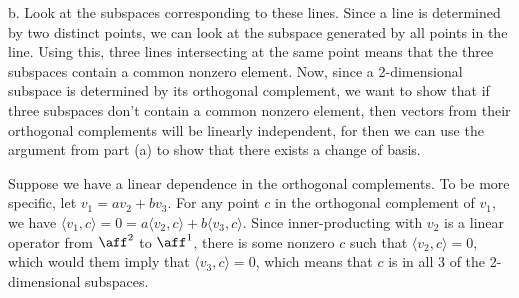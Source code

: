 \documentclass{article}
\begin{document}
b. Look at the subspaces corresponding to these lines. Since a line is determined by two distinct points, we can look at the subspace generated by all points in the line. Using this, three lines intersecting at the same point means that the three subspaces contain a common nonzero element. Now, since a 2-dimensional subspace is determined by its orthogonal complement, we want to show that if three subspaces don't contain a common nonzero element, then vectors from their orthogonal complements will be linearly independent, for then we can use the argument from part (a) to show that there exists a change of basis. 

Suppose we have a linear dependence in the orthogonal complements. To be more specific, let $v_1=av_2+bv_3$. For any point $c$ in the orthogonal complement of $v_1$, we have $\langle v_1,c\rangle=0=a\langle v_2,c\rangle+b\langle v_3,c\rangle$. Since inner-producting with $v_2$ is a linear operator from $\aff^2$ to $\aff^1$, there is some nonzero $c$ such that $\langle v_2,c\rangle=0$, which would them imply that $\langle v_3,c\rangle=0$, which means that $c$ is in all 3 of the 2-dimensional subspaces.
\end{document}
